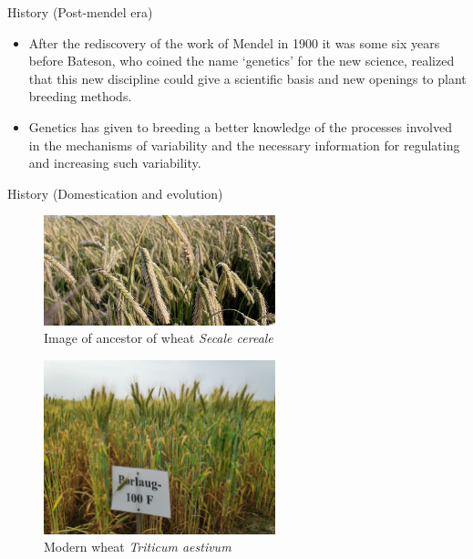 \documentclass[11pt,ignorenonframetext,aspectratio=169]{beamer}
\providecommand{\tightlist}{%
  \setlength{\itemsep}{0pt}\setlength{\parskip}{0pt}}
\begin{document}
\begin{frame}{History (Post-mendel era)}
\protect\hypertarget{history-post-mendel-era}{}
\begin{itemize}
\tightlist
\item
  After the rediscovery of the work of Mendel in 1900 it was some six
  years before Bateson, who coined the name `genetics' for the new
  science, realized that this new discipline could give a scientific
  basis and new openings to plant breeding methods.
\item
  Genetics has given to breeding a better knowledge of the processes
  involved in the mechanisms of variability and the necessary
  information for regulating and increasing such variability.
\end{itemize}
\end{frame}

\begin{frame}{History (Domestication and evolution)}
\protect\hypertarget{history-domestication-and-evolution}{}
\begin{figure}
\includegraphics[width=0.6\textwidth, keepaspectratio,height=0.38\textheight]{./images/rye_crop} \caption{Image of ancestor of wheat \textit{Secale cereale}}\label{fig:secale-cereale}
\end{figure}

\begin{figure}
\includegraphics[width=0.6\textwidth, keepaspectratio,height=0.38\textheight]{./images/wheat_borlaug-100} \caption{Modern wheat \textit{Triticum aestivum}}\label{fig:modern-wheat}
\end{figure}
\end{frame}
\end{document}
